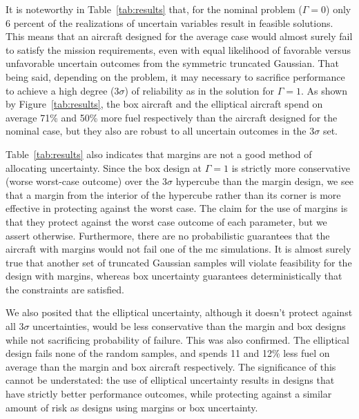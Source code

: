 It is noteworthy in Table~\ref{tab:results} that, for the nominal problem ($\Gamma = 0$)
only 6 percent of the realizations of
uncertain variables result in feasible solutions.
This means that an aircraft designed for the average case would almost surely
fail to satisfy the mission requirements, even with equal likelihood of favorable versus
unfavorable uncertain outcomes from the symmetric truncated Gaussian.
That being said, depending on the problem, it may necessary to sacrifice
performance to achieve a high degree ($3\sigma$) of
reliability as in the solution for $\Gamma = 1$. As shown by Figure~\ref{tab:results}, the box aircraft
and the elliptical aircraft spend on average 71\% and 50\% more fuel respectively
than the aircraft designed for the nominal case, but they also are
robust to all uncertain outcomes in the $3\sigma$ set.

Table~\ref{tab:results} also indicates that margins are not a good method of
allocating uncertainty. Since the box design at $\Gamma=1$ is strictly
more conservative (worse worst-case outcome) over the $3\sigma$ hypercube
than the margin design, we see that a margin from the interior of the hypercube
rather than its corner is more effective in protecting against the worst case.
The claim for the use of margins is that they protect against the worst case outcome of
each parameter, but we assert otherwise. Furthermore, there are no probabilistic
guarantees that the aircraft
with margins would not fail one of the \gls{mc} simulations. It is almost surely true
that another set of truncated Gaussian samples will violate feasibility for the design with margins,
whereas box uncertainty guarantees deterministically that the constraints are satisfied.

We also posited that the elliptical uncertainty, although it doesn't
protect against all $3\sigma$ uncertainties, would be less conservative than the
margin and box designs while not sacrificing probability of failure. This was
also confirmed. The elliptical design fails none of the random samples,
and spends 11 and 12\% less fuel on average
than the margin and box aircraft respectively.
The significance of this cannot be understated: the use of elliptical uncertainty
results in designs that have strictly better performance outcomes, while protecting
against a similar amount of risk as designs using margins or box uncertainty.

